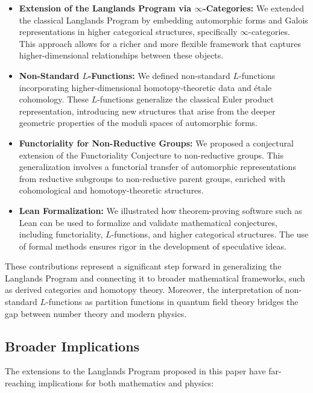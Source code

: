 \documentclass{article}
\theoremstyle{remark}
\begin{document}
\begin{itemize}
    \item \textbf{Extension of the Langlands Program via $\infty$-Categories:} We extended the classical Langlands Program by embedding automorphic forms and Galois representations in higher categorical structures, specifically $\infty$-categories. This approach allows for a richer and more flexible framework that captures higher-dimensional relationships between these objects.
    \item \textbf{Non-Standard $L$-Functions:} We defined non-standard $L$-functions incorporating higher-dimensional homotopy-theoretic data and étale cohomology. These $L$-functions generalize the classical Euler product representation, introducing new structures that arise from the deeper geometric properties of the moduli spaces of automorphic forms.
    \item \textbf{Functoriality for Non-Reductive Groups:} We proposed a conjectural extension of the Functoriality Conjecture to non-reductive groups. This generalization involves a functorial transfer of automorphic representations from reductive subgroups to non-reductive parent groups, enriched with cohomological and homotopy-theoretic structures.
    \item \textbf{Lean Formalization:} We illustrated how theorem-proving software such as Lean can be used to formalize and validate mathematical conjectures, including functoriality, $L$-functions, and higher categorical structures. The use of formal methods ensures rigor in the development of speculative ideas.
\end{itemize}

These contributions represent a significant step forward in generalizing the Langlands Program and connecting it to broader mathematical frameworks, such as derived categories and homotopy theory. Moreover, the interpretation of non-standard $L$-functions as partition functions in quantum field theory bridges the gap between number theory and modern physics.

\subsection{Broader Implications}

The extensions to the Langlands Program proposed in this paper have far-reaching implications for both mathematics and physics:
\end{document}
